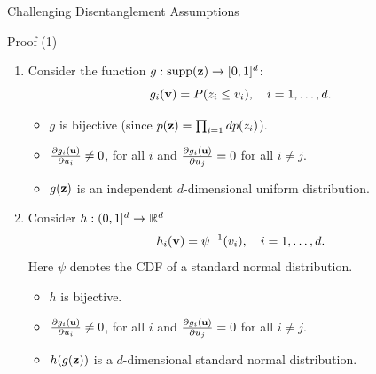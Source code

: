 \begin{frame}{Challenging Disentanglement Assumptions}
	\begin{block}{Proof (1)}
		\begin{enumerate}
			\item 
			Consider the function $g: \text{supp}(\mathbf{z}) \rightarrow [0, 1]^d$:
			\vspace{-0.1cm}
			\[
				g_i(\mathbf{v}) = P(z_i \leq v_i), \quad i=1, \dots, d.
			\]
			\vspace{-0.4cm}
			\begin{itemize}
				\item $g$ is bijective (since $p(\mathbf{z}) = \prod_{i=1}dp(z_i)$).
				\item $\frac{\partial g_i(\mathbf{u})}{\partial u_i} \neq 0$, for all $i$ and $\frac{\partial g_i(\mathbf{u})}{\partial u_j} = 0$ for all $i \neq j$.
				\item $g(\mathbf{z})$ is an independent $d$-dimensional uniform distribution.
			\end{itemize}
			\item 
			Consider $h: (0, 1]^d \rightarrow \mathbb{R}^d$
			\[
				h_i(\mathbf{v}) = \psi^{-1}(v_i), \quad i= 1, \dots, d.
			\]
			Here $\psi$  denotes the CDF of a standard normal distribution.
			\begin{itemize}
				\item $h$ is bijective.
				\item $\frac{\partial g_i(\mathbf{u})}{\partial u_i} \neq 0$, for all $i$ and $\frac{\partial g_i(\mathbf{u})}{\partial u_j} = 0$ for all $i \neq j$.
				\item $h(g(\mathbf{z}))$  is a $d$-dimensional standard normal distribution.
			\end{itemize}
		\end{enumerate}
	\end{block}

\end{frame}
